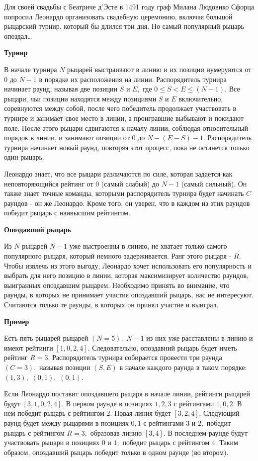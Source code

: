 Для своей свадьбы с Беатриче д'Эсте в 1491 году граф Милана Людовико Сфорца попросил Леонардо организовать свадебную церемонию, включая большой рыцарский турнир, который бы длился три дня. Но самый популярный рыцарь опоздал\dots

\bf{Турнир}

В начале турнира $N$ рыцарей выстраивают в линию и их позиции нумеруются от $0$ до $N - 1$ в порядке их расположения на линии. Распорядитель турнира начинает раунд, называя две позиции $S$ и $E,$ где $0 \le S < E \le (N - 1).$ Все рыцари, чьи позиции находятся между позициями $S$ и $E$ включительно, соревнуются между собой, после чего победитель продолжает участвовать в турнире и занимает свое место в линии, а проигравшие выбывают и покидают поле. После этого рыцари сдвигаются к началу линии, соблюдая относительный порядок в линии, и занимают позиции от $0$ до $N - (E - S) - 1.$ Распорядитель турнира начинает новый раунд, повторяя этот процесс, пока не останется только один рыцарь.

Леонардо знает, что все рыцари различаются по силе, которая задается как неповторяющийся рейтинг от $0$ (самый слабый) до $N - 1$ (самый сильный). Он также знает точные команды, которыми распорядитель турнира будет начинать $C$ раундов - он же Леонардо. Кроме того, он уверен, что в каждом из этих раундов победит рыцарь с наивысшим рейтингом.

\bf{Опоздавший рыцарь}

Из $N$ рыцарей $N - 1$ уже выстроенны в линию, не хватает только самого популярного рыцаря, который немного задерживается. Ранг этого рыцаря - $R.$ Чтобы извлечь из этого выгоду, Леонардо хочет использовать его популярность и выбрать для него позицию в линии, которая максимизирует количество раундов, выигранных опоздавшим рыцарем. Необходимо принять во внимание, что раунды, в которых не принимает участия опоздавший рыцарь, нас не интересуют. Считаются только те раунды, в которых он принял участие и выиграл.

\bf{Пример}

Есть пять рыцарей рыцарей $(N = 5),$ $N - 1$ из них уже расставлены в линию и имеют рейтинги $[1, 0, 2, 4].$ Следовательно, опоздавний рыцарь будет иметь рейтинг $R = 3.$ Распорядитель турнира собирается провести три раунда $(C = 3),$ называя позиции $(S, E)$ в начале каждого раунда в таком порядке: $(1, 3),$ $(0, 1),$ $(0, 1).$

Если Леонардо поставит опоздавшего рыцаря в начале линии, рейтинги рыцарей будут $[3, 1, 0, 2, 4].$ В первом раунде в позициях $1, 2, 3$ с рейтингами $1, 0, 2.$ В нем победит рыцарь с рейтингом $2.$ Новая линия будет $[3, 2, 4].$ Следующий раунд будет между рыцарями в позициях $0, 1$ с рейтингами $3$ и $2,$ победит рыцарь с рейтингом $R = 3,$ образовав линию $[3, 4].$ В последнем раунде будут участвовать рыцари в позициях $0$ и $1,$ победит рыцарь с рейтингом $4.$ Таким образом, опоздавший рыцарь победит только в одном раунде (во втором).

